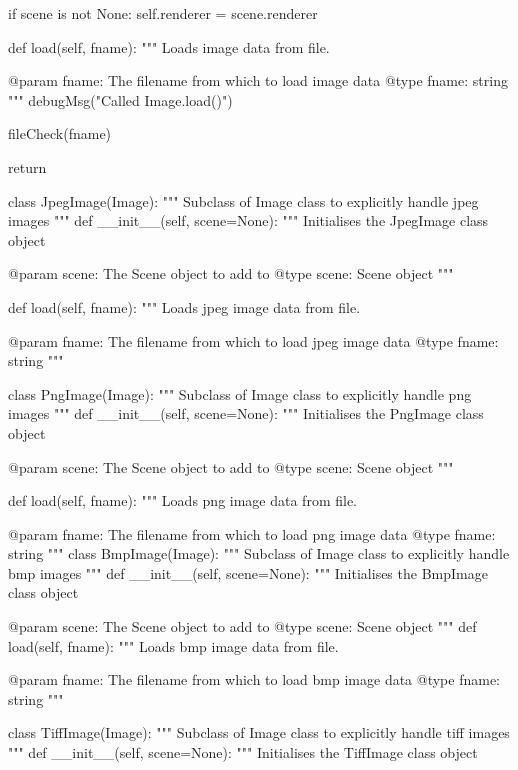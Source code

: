 \begin{python}
\begin{python}
\begin{verbose}
        if scene is not None:
            self.renderer = scene.renderer
        
    def load(self, fname):
        """
        Loads image data from file.

        @param fname: The filename from which to load image data
        @type fname: string
        """
        debugMsg("Called Image.load()")

        fileCheck(fname)

        return

class JpegImage(Image):
    """
    Subclass of Image class to explicitly handle jpeg images
    """
    def __init__(self, scene=None):
        """
        Initialises the JpegImage class object

        @param scene: The Scene object to add to
        @type scene: Scene object
        """

    def load(self, fname):
        """
        Loads jpeg image data from file.

        @param fname: The filename from which to load jpeg image data
        @type fname: string
        """

class PngImage(Image):
    """
    Subclass of Image class to explicitly handle png images
    """
    def __init__(self, scene=None):
        """
        Initialises the PngImage class object

        @param scene: The Scene object to add to
        @type scene: Scene object
        """

    def load(self, fname):
        """
        Loads png image data from file.

        @param fname: The filename from which to load png image data
        @type fname: string
        """
class BmpImage(Image):
    """
    Subclass of Image class to explicitly handle bmp images
    """
    def __init__(self, scene=None):
        """
        Initialises the BmpImage class object

        @param scene: The Scene object to add to
        @type scene: Scene object
        """
    def load(self, fname):
        """
        Loads bmp image data from file.

        @param fname: The filename from which to load bmp image data
        @type fname: string
        """

class TiffImage(Image):
    """
    Subclass of Image class to explicitly handle tiff images
    """
    def __init__(self, scene=None):
        """
        Initialises the TiffImage class object


\end{verbose}
\end{python}
\end{python}
